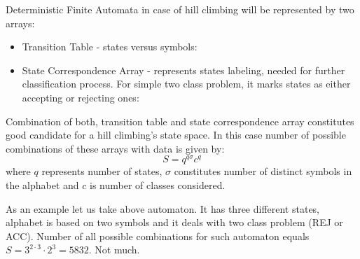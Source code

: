 \documentclass{mini}
\begin{document}
Deterministic Finite Automata in case of hill climbing will be represented by two arrays:
\begin{itemize}
  \item Transition Table - states versus symbols:\\
  		\begin{minipage}[t]{\linewidth}
          \raggedright
    	\end{minipage}
  \item State Correspondence Array - represents states labeling, needed for further classification process. For simple two class problem, it marks states as either accepting or rejecting ones:\\
  \begin{minipage}[t]{\linewidth}
          \raggedright
    	\end{minipage}
\end{itemize}
\bigskip
Combination of both, transition table and state correspondence array constitutes good candidate for a  hill climbing's state space. In this case number of possible combinations of these arrays with data is given by:
\begin{equation}
S = q^{q \sigma}c^{q}
\end{equation}
where $q$ represents number of states, $\sigma$ constitutes number of distinct symbols in the alphabet and $c$ is number of classes considered.

As an example let us take above automaton. It has three different states, alphabet is based on two symbols and it deals with two class problem (\textsc{REJ} or \textsc{ACC}). Number of all possible combinations for such automaton equals $S = 3^{2 \cdot 3}\cdot2^{3} = 5832$. Not much.
\end{document}
